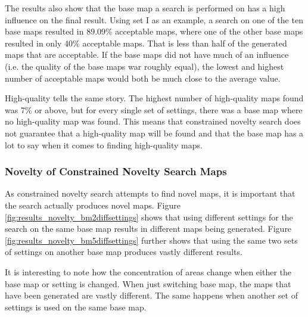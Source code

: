 The results also show that the base map a search is performed on has a high influence on the final result. Using set I as an example, a search on one of the ten base maps resulted in 89.09\% acceptable maps, where one of the other base maps resulted in only 40\% acceptable maps. That is less than half of the generated maps that are acceptable. If the base maps did not have much of an influence (i.e. the quality of the base maps war roughly equal), the lowest and highest number of acceptable maps would both be much close to the average value.

High-quality tells the same story. The highest number of high-quality maps found was 7\% or above, but for every single set of settings, there was a base map where no high-quality map was found. This means that constrained novelty search does not guarantee that a high-quality map will be found and that the base map has a lot to say when it comes to finding high-quality maps.

\subsubsection*{Novelty of Constrained Novelty Search Maps}

As constrained novelty search attempts to find novel maps, it is important that the search actually produces novel maps. Figure \ref{fig:results_novelty_bm2diffsettings} shows that using different settings for the search on the same base map results in different maps being generated. Figure \ref{fig:results_novelty_bm5diffsettings} further shows that using the same two sets of settings on another base map produces vastly different results. 

It is interesting to note how the concentration of areas change when either the base map or setting is changed. When just switching base map, the maps that have been generated are vastly different. The same happens when another set of settings is used on the same base map.


